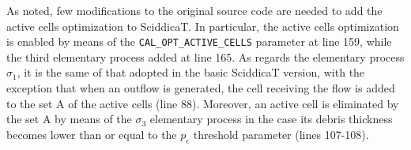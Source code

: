 









As noted, few modifications to the original source code
are needed to add the active cells optimization to SciddicaT. In
particular, the active cells optimization is enabled by means of the
\verb'CAL_OPT_ACTIVE_CELLS' parameter at line 159, while the third
elementary process added at line 165. As regards the elementary
process $\sigma_1$, it is the same of that adopted in the basic SciddicaT
version, with the exception that when an outflow is generated, the
cell receiving the flow is added to the set A of the active cells
(line 88). Moreover, an active cell is eliminated by the set A by
means of the $\sigma_3$ elementary process in the case its debris
thickness becomes lower than or equal to the $p_\epsilon$ threshold
parameter (lines 107-108).

